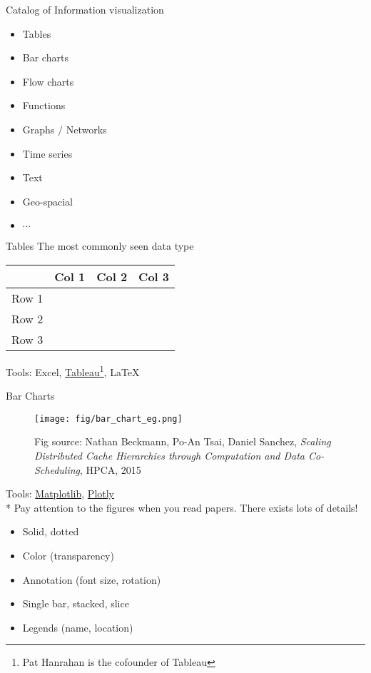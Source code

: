 \documentclass{../TexTemplate/myslide}
\begin{document}
\begin{frame}{Catalog of Information visualization}
\begin{itemize}
	\item Tables
	\item Bar charts
	\item Flow charts
	\item Functions
	\item Graphs / Networks
	\item Time series
	\item Text
	\item Geo-spacial
	\item $\cdots$
\end{itemize}
\end{frame}

\begin{frame}{Tables}
The most commonly seen data type
\begin{center}
\begin{tabular}{cccc}\hline
 & Col 1 & Col 2 & Col 3\\\hline
Row 1 & & &\\
Row 2 & & &\\
Row 3 & & &\\\hline
\end{tabular}
\end{center}
Tools: Excel, \href{https://www.tableau.com/}{Tableau}\footnote{Pat Hanrahan is the cofounder of Tableau}, \LaTeX
\end{frame}

\begin{frame}{Bar Charts}
\begin{figure}
\centering
\texttt{[image: fig/bar\_chart\_eg.png]}
\caption*{\scriptsize Fig source: Nathan Beckmann, Po-An Tsai, Daniel Sanchez, \emph{Scaling Distributed Cache Hierarchies through Computation and Data Co-Scheduling}, HPCA, 2015}
\end{figure}
\small
Tools: \href{https://matplotlib.org/}{Matplotlib}, \href{https://plot.ly/}{Plotly}\\
* Pay attention to the figures when you read papers. There exists lots of details!
\begin{itemize}
	\item Solid, dotted
	\item Color (transparency)
	\item Annotation (font size, rotation)
	\item Single bar, stacked, slice
	\item Legends (name, location)
\end{itemize}
\end{frame}
\end{document}
